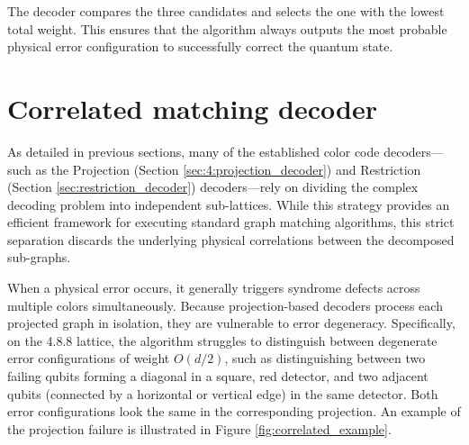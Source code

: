 The decoder compares the three candidates and selects the one with the lowest total weight. This ensures that the algorithm always outputs the most probable physical error configuration to successfully correct the quantum state.


\section{Correlated matching decoder}
\label{sec:correlated_matching}

As detailed in previous sections, many of the established color code decoders---such as the Projection (Section \ref{sec:4:projection_decoder}) and Restriction (Section \ref{sec:restriction_decoder}) decoders---rely on dividing the complex decoding problem into independent sub-lattices. While this strategy provides an efficient framework for executing standard graph matching algorithms, this strict separation discards the underlying physical correlations between the decomposed sub-graphs. 

When a physical error occurs, it generally triggers syndrome defects across multiple colors simultaneously. Because projection-based decoders process each projected graph in isolation, they are vulnerable to error degeneracy. Specifically, on the 4.8.8 lattice, the algorithm struggles to distinguish between degenerate error configurations of weight $O(d/2)$, such as distinguishing between two failing qubits forming a diagonal in a square, red detector, and two adjacent qubits (connected by a horizontal or vertical edge) in the same detector. Both error configurations look the same in the corresponding projection. An example of the projection failure is illustrated in Figure \ref{fig:correlated_example}.

